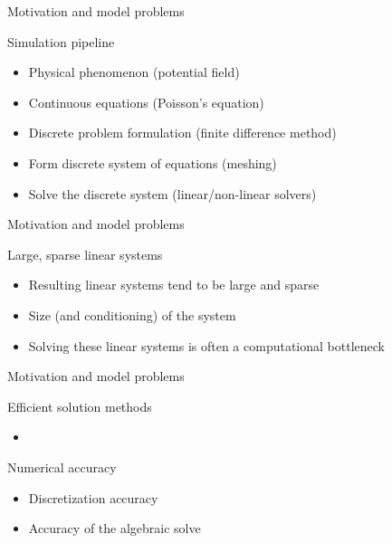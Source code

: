 \documentclass[18pt,xcolor=table]{beamer}
\begin{document}
\begin{frame}{Motivation and model problems}
\begin{block}{Simulation pipeline}
\begin{itemize}
\item Physical phenomenon (potential field)
\item Continuous equations (Poisson's equation)
\item Discrete problem formulation (finite difference method)
\item Form discrete system of equations (meshing)
\item Solve the discrete system (linear/non-linear solvers)
\end{itemize}
\end{block}

\end{frame}

\begin{frame}{Motivation and model problems}
\begin{block}{Large, sparse linear systems}
\begin{itemize}
\item Resulting linear systems tend to be large and sparse
\item Size (and conditioning) of the system 
\item Solving these linear systems is often a computational bottleneck
\end{itemize}
\end{block}

\end{frame}

\begin{frame}{Motivation and model problems}
\begin{block}{Efficient solution methods}
\begin{itemize}
\item
\end{itemize}
\end{block}
\begin{block}{Numerical accuracy}
\begin{itemize}
\item Discretization accuracy
\item Accuracy of the algebraic solve
\end{itemize}
\end{block}

\end{frame}
\end{document}

